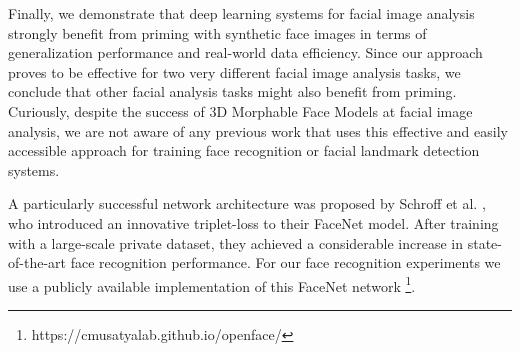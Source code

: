 \documentclass[10pt,twocolumn,letterpaper]{article}
\begin{document}
	Finally, we demonstrate that deep learning systems for facial image analysis strongly benefit from priming with synthetic face images in terms of generalization performance and real-world data efficiency. Since our approach proves to be effective for two very different facial image analysis tasks, we conclude that other facial analysis tasks might also benefit from priming. Curiously, despite the success of 3D Morphable Face Models at facial image analysis, we are not aware of any previous work that uses this effective and easily accessible approach for training face recognition or facial landmark detection systems.
	
      
    
    A particularly successful network architecture was proposed by Schroff et al. \cite{schroff2015facenet}, who introduced an innovative triplet-loss to their FaceNet model. After training with a large-scale private dataset, they achieved a considerable increase in state-of-the-art face recognition performance. For our face recognition experiments we use a publicly available implementation of this FaceNet network \footnote{https://cmusatyalab.github.io/openface/}.
    
\end{document}
